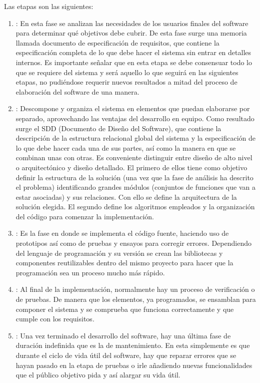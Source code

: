     Las etapas son las siguientes:
    \begin{enumerate}
    \item {}: En esta fase se analizan las necesidades de los usuarios finales del software para determinar qué objetivos debe cubrir. De esta fase surge una memoria llamada documento de especificación de requisitos, que contiene la especificación completa de lo que debe hacer el sistema sin entrar en detalles internos.
Es importante señalar que en esta etapa se debe consensuar todo lo que se requiere del sistema y será aquello lo que seguirá en las siguientes etapas, no pudiéndose requerir nuevos resultados a mitad del proceso de elaboración del software de una manera.
    
    \item {}: Descompone y organiza el sistema en elementos que puedan elaborarse por separado, aprovechando las ventajas del desarrollo en equipo. Como resultado surge el SDD (Documento de Diseño del Software), que contiene la descripción de la estructura relacional global del sistema y la especificación de lo que debe hacer cada una de sus partes, así como la manera en que se combinan unas con otras.
Es conveniente distinguir entre diseño de alto nivel o arquitectónico y diseño detallado. El primero de ellos tiene como objetivo definir la estructura de la solución (una vez que la fase de análisis ha descrito el problema) identificando grandes módulos (conjuntos de funciones que van a estar asociadas) y sus relaciones. Con ello se define la arquitectura de la solución elegida. El segundo define los algoritmos empleados y la organización del código para comenzar la implementación.
    \item {}: Es la fase en donde se implementa el código fuente, haciendo uso de prototipos así como de pruebas y ensayos para corregir errores.
Dependiendo del lenguaje de programación y su versión se crean las bibliotecas y componentes reutilizables dentro del mismo proyecto para hacer que la programación sea un proceso mucho más rápido.

    \item {}: Al final de la implementación, normalmente hay un proceso de verificación o de pruebas. De manera que los elementos, ya programados, se ensamblan para componer el sistema y se comprueba que funciona correctamente y que cumple con los requisitos.
    
    \item {}: Una vez terminado el desarrollo del software, hay una última fase de duración indefinida que es la de mantenimiento. En esta simplemente es que durante el ciclo de vida útil del software, hay que reparar errores que se hayan pasado en la etapa de pruebas o irle añadiendo nuevas funcionalidades que el público objetivo pida y así alargar su vida útil.
    \end{enumerate}
    
